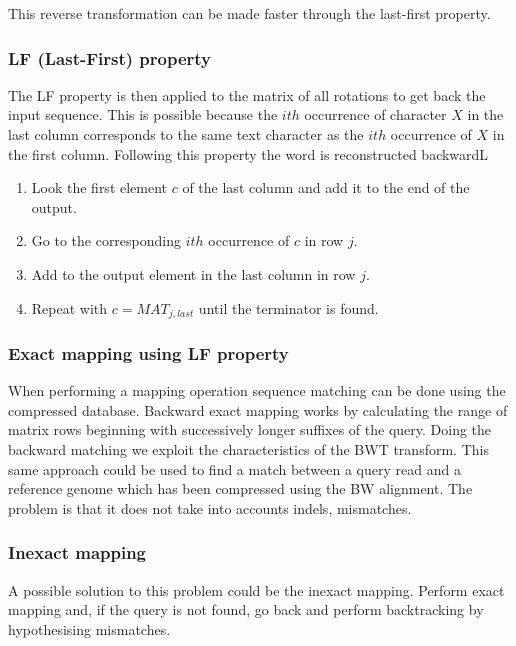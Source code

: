         This reverse transformation can be made faster through the last-first property.

        \subsubsection{LF (Last-First) property}
        The LF property is then applied to the matrix of all rotations to get back the input sequence.
        This is possible because the $ith$ occurrence of character $X$ in the last column corresponds to the same text character as the $ith$ occurrence of $X$ in the first column.
        Following this property the word is reconstructed backwardL

        \begin{multicols}{2}
            \begin{enumerate}
                \item Look the first element $c$ of the last column and add it to the end of the output.
                \item Go to the corresponding $ith$ occurrence of $c$ in row $j$.
                \item Add to the output element in the last column in row $j$.
                \item Repeat with $c = MAT_{j,last}$ until the terminator is found.
            \end{enumerate}
        \end{multicols}

        \subsubsection{Exact mapping using LF property}
        When performing a mapping operation sequence matching can be done using the compressed database.
        Backward exact mapping works by calculating the range of matrix rows beginning with successively longer suffixes of the query.
        Doing the backward matching we exploit the characteristics of the BWT transform.
        This same approach could be used to find a match between a query read and a reference genome which has been compressed using the BW alignment.
        The problem is that it does not take into accounts indels, mismatches.

        \subsubsection{Inexact mapping}
        A possible solution to this problem could be the inexact mapping.
        Perform exact mapping and, if the query is not found, go back and perform backtracking by hypothesising mismatches.
